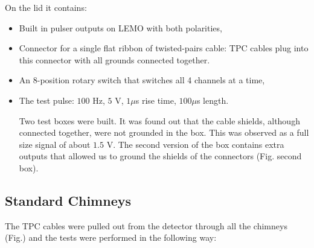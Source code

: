 On the lid it contains:
\begin{itemize}
\item Built in pulser outputs on LEMO with both polarities,
\item Connector for a single flat ribbon of twisted-pairs cable: TPC cables plug into this connector with all grounds connected together.
\item An 8-position rotary switch that switches all 4 channels at a time,
\item The test pulse: $100$ Hz, $5$ V, $1 \mu $s rise time, $100 \mu $s length.

Two test boxes were built. It was found out that the cable shields, although connected together, were not grounded in the box. This was observed as a full size signal of about $1.5$ V.  The second version of the box contains extra outputs that allowed us to ground the shields of the connectors (Fig. second box). 
\end{itemize}




\subsection{Standard Chimneys}
\label{ssec:stand_chimn}



The TPC cables were pulled out from the detector through all the chimneys (Fig.) and the tests were performed in the following way: \\






